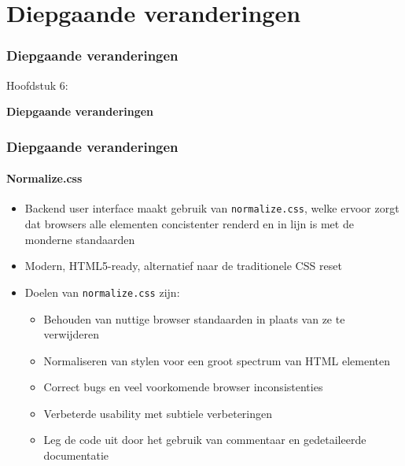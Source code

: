 %

\section{Diepgaande veranderingen}
\begin{frame}[fragile]
	\frametitle{Diepgaande veranderingen}

	\begin{center}\huge{Hoofdstuk 6:}\end{center}
	\begin{center}\huge{\color{typo3darkgrey}\textbf{Diepgaande veranderingen}}\end{center}

\end{frame}


\begin{frame}[fragile]
	\frametitle{Diepgaande veranderingen}
	\framesubtitle{Normalize.css}

	\begin{itemize}
		\item Backend user interface maakt gebruik van \texttt{normalize.css},\newline
			welke ervoor zorgt dat browsers alle elementen concistenter renderd en in lijn is met de monderne standaarden
		\item Modern, HTML5-ready, alternatief naar de traditionele CSS reset
		\item Doelen van \texttt{normalize.css} zijn:

			\begin{itemize}
				\item Behouden van nuttige browser standaarden in plaats van ze te verwijderen
				\item Normaliseren van stylen voor een groot spectrum van HTML elementen
				\item Correct bugs en veel voorkomende browser inconsistenties
				\item Verbeterde usability met subtiele verbeteringen
				\item Leg de code uit door het gebruik van commentaar en gedetaileerde documentatie
			\end{itemize}

	\end{itemize}

\end{frame}

